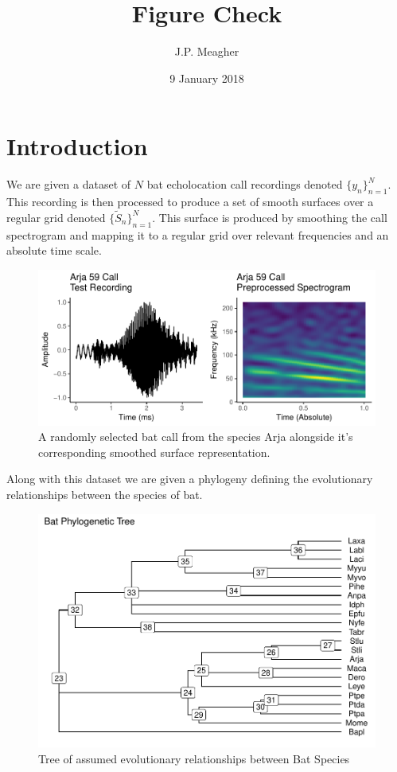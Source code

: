 \documentclass[]{article}
\title{Figure Check}
\author{J.P. Meagher}
\date{9 January 2018}
\begin{document}
\maketitle

\section{Introduction}\label{introduction}

We are given a dataset of \(N\) bat echolocation call recordings denoted
\(\{y_n\}_{n = 1}^N\). This recording is then processed to produce a set
of smooth surfaces over a regular grid denoted
\(\{\tilde{S}_n\}_{n=1}^{N}\). This surface is produced by smoothing the
call spectrogram and mapping it to a regular grid over relevant
frequencies and an absolute time scale.

\begin{figure}
\centering
\includegraphics{figure_test_files/figure-latex/recording figure-1.pdf}
\caption{A randomly selected bat call from the species Arja alongside
it's corresponding smoothed surface representation.}
\end{figure}

Along with this dataset we are given a phylogeny defining the
evolutionary relationships between the species of bat.

\begin{figure}
\centering
\includegraphics{figure_test_files/figure-latex/phylogeny figure-1.pdf}
\caption{Tree of assumed evolutionary relationships between Bat Species}
\end{figure}
\end{document}
